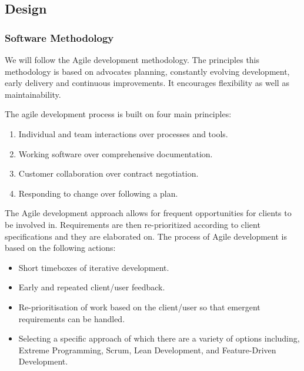 \documentclass{article}
\begin{document}
\subsection{Design}

	\subsubsection{Software Methodology}
	We will follow the Agile development methodology. The principles this methodology is based on advocates planning, constantly evolving development, early delivery and continuous improvements. It encourages flexibility as well as maintainability.

	\begin{flushleft}
	The agile development process is built on four main principles:
		\begin{enumerate}
			\item Individual and team interactions over processes and tools.
			\item Working software over comprehensive documentation.
			\item Customer collaboration over contract negotiation.
			\item Responding to change over following a plan.
		\end{enumerate}
	\end{flushleft}

	\begin{flushleft}

	The Agile development approach allows for frequent opportunities for clients to be involved in. Requirements are then re-prioritized according to client specifications and they are elaborated on. The process of Agile development is based on the following actions:

	\end{flushleft}

    \begin{itemize}
			\item Short timeboxes of iterative development.
			\item Early and repeated client/user feedback.
			\item Re-prioritisation of work based on the client/user so that emergent requirements can be handled.
			\item Selecting a specific approach of which there are a variety of options including, Extreme Programming, Scrum, Lean Development, and Feature-Driven Development.
	\end{itemize}
\end{document}
